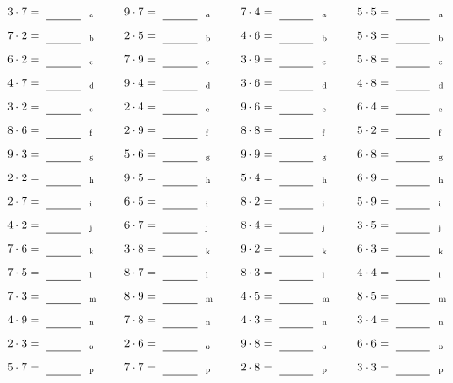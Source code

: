 \documentclass
[
  draft    = true,
  fontsize = 11pt,
  parskip  = half-
]
{scrartcl}
\begin{document}
\par\vfill\par
\begin{align*}
    \pline{3\cdot7}&=\rline{a}
  & \pline{9\cdot7}&=\rline{a}
  & \pline{7\cdot4}&=\rline{a}
  & \pline{5\cdot5}&=\rline{a} \\[1ex]
    \pline{7\cdot2}&=\rline{b}
  & \pline{2\cdot5}&=\rline{b}
  & \pline{4\cdot6}&=\rline{b}
  & \pline{5\cdot3}&=\rline{b} \\[1ex]
    \pline{6\cdot2}&=\rline{c}
  & \pline{7\cdot9}&=\rline{c}
  & \pline{3\cdot9}&=\rline{c}
  & \pline{5\cdot8}&=\rline{c} \\[1ex]
    \pline{4\cdot7}&=\rline{d}
  & \pline{9\cdot4}&=\rline{d}
  & \pline{3\cdot6}&=\rline{d}
  & \pline{4\cdot8}&=\rline{d} \\[1ex]
    \pline{3\cdot2}&=\rline{e}
  & \pline{2\cdot4}&=\rline{e}
  & \pline{9\cdot6}&=\rline{e}
  & \pline{6\cdot4}&=\rline{e} \\[1ex]
    \pline{8\cdot6}&=\rline{f}
  & \pline{2\cdot9}&=\rline{f}
  & \pline{8\cdot8}&=\rline{f}
  & \pline{5\cdot2}&=\rline{f} \\[1ex]
    \pline{9\cdot3}&=\rline{g}
  & \pline{5\cdot6}&=\rline{g}
  & \pline{9\cdot9}&=\rline{g}
  & \pline{6\cdot8}&=\rline{g} \\[1ex]
    \pline{2\cdot2}&=\rline{h}
  & \pline{9\cdot5}&=\rline{h}
  & \pline{5\cdot4}&=\rline{h}
  & \pline{6\cdot9}&=\rline{h} \\[1ex]
    \pline{2\cdot7}&=\rline{i}
  & \pline{6\cdot5}&=\rline{i}
  & \pline{8\cdot2}&=\rline{i}
  & \pline{5\cdot9}&=\rline{i} \\[1ex]
    \pline{4\cdot2}&=\rline{j}
  & \pline{6\cdot7}&=\rline{j}
  & \pline{8\cdot4}&=\rline{j}
  & \pline{3\cdot5}&=\rline{j} \\[1ex]
    \pline{7\cdot6}&=\rline{k}
  & \pline{3\cdot8}&=\rline{k}
  & \pline{9\cdot2}&=\rline{k}
  & \pline{6\cdot3}&=\rline{k} \\[1ex]
    \pline{7\cdot5}&=\rline{l}
  & \pline{8\cdot7}&=\rline{l}
  & \pline{8\cdot3}&=\rline{l}
  & \pline{4\cdot4}&=\rline{l} \\[1ex]
    \pline{7\cdot3}&=\rline{m}
  & \pline{8\cdot9}&=\rline{m}
  & \pline{4\cdot5}&=\rline{m}
  & \pline{8\cdot5}&=\rline{m} \\[1ex]
    \pline{4\cdot9}&=\rline{n}
  & \pline{7\cdot8}&=\rline{n}
  & \pline{4\cdot3}&=\rline{n}
  & \pline{3\cdot4}&=\rline{n} \\[1ex]
    \pline{2\cdot3}&=\rline{o}
  & \pline{2\cdot6}&=\rline{o}
  & \pline{9\cdot8}&=\rline{o}
  & \pline{6\cdot6}&=\rline{o} \\[1ex]
    \pline{5\cdot7}&=\rline{p}
  & \pline{7\cdot7}&=\rline{p}
  & \pline{2\cdot8}&=\rline{p}
  & \pline{3\cdot3}&=\rline{p}
\end{align*}
\end{document}

